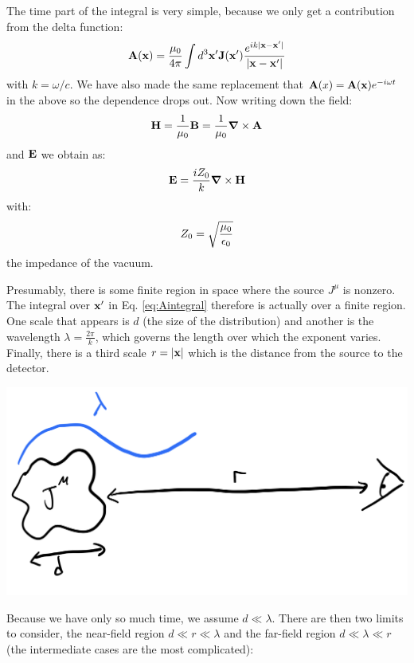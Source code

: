 The time part of the integral is very simple, because we only get a contribution from the delta function:
\begin{equation}\label{eq:Aintegral}
    \mathbf{A}(\mathbf{x}) = \frac{\mu_0}{4\pi}\int d^3\mathbf{x}'\mathbf{J}(\mathbf{x}')\frac{e^{ik\lvert \mathbf{x} - \mathbf{x}' \rvert}}{\lvert \mathbf{x} - \mathbf{x}' \rvert}
\end{equation}
with $k = \omega/c$. We have also made the same replacement that $\mathbf{A}(x) = \mathbf{A}(\mathbf{x})e^{-i\omega t}$ in the above so the dependence drops out. Now writing down the field:
\begin{equation}
    \v{H} = \frac{1}{\mu_0}\v{B} = \frac{1}{\mu_0}\nabla \times \v{A} 
\end{equation}
and $\mathbf{E}$ we obtain as:
\begin{equation}
    \v{E} = \frac{iZ_0}{k}\nabla \times \v{H}
\end{equation}
with:
\begin{equation}
    Z_0 = \sqrt{\frac{\mu_0}{\epsilon_0}}
\end{equation}
the impedance of the vacuum.

Presumably, there is some finite region in space where the source $J^\mu$ is nonzero. The integral over $\mathbf{x}'$ in Eq. \eqref{eq:Aintegral} therefore is actually over a finite region. One scale that appears is $d$ (the size of the distribution) and another is the wavelength $\lambda = \frac{2\pi}{k}$, which governs the length over which the exponent varies. Finally, there is a third scale $r = \lvert \mathbf{x} \rvert$ which is the distance from the source to the detector.

\begin{center}
    \includegraphics[scale=0.35]{Lectures/Images/lec10-lambdard.png}
\end{center}

Because we have only so much time, we assume $d \ll \lambda$. There are then two limits to consider, the near-field region $d \ll r \ll \lambda$ and the far-field region $d \ll \lambda \ll r$ (the intermediate cases are the most complicated):

